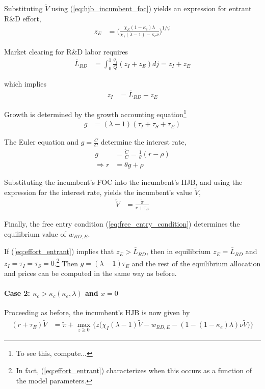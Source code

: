 \documentclass[11pt,english]{article}
\theoremstyle{remark}
\begin{document}
Substituting $\tilde{V}$ using (\ref{eq:hjb_incumbent_foc}) yields an expression for entrant R\&D effort, 
\begin{align}
	z_E &= \Big( \frac{\chi_E (1-\kappa_{e}) \lambda}{\chi_I(\lambda-1) - \kappa_c \nu } \Big)^{1/\psi} \label{eq:effort_entrant}
\end{align}

Market clearing for R\&D labor requires
\begin{align}
	\bar{L}_{RD} &= \int_0^1 \frac{q_j}{Q} (z_{I} + z_{E}) dj = z_I + z_E
\end{align}
 
which implies
\begin{align}
	z_I &= \bar{L}_{RD} - z_E \label{eq:zI_asFuncZe}
\end{align}

Growth is determined by the growth accounting equation\footnote{To see this, compute...}
\begin{align}
g &= (\lambda - 1)(\tau_I + \tau_S + \tau_E) \label{eq:growth_accounting}
\end{align}

The Euler equation and $g = \frac{\dot{C}}{C}$ determine the interest rate, 
\begin{align}
	g &= \frac{\dot{C}}{C} = \frac{1}{\theta} (r - \rho) \label{eq:euler} \\
	\Rightarrow r &= \theta g + \rho \nonumber
\end{align}

Substituting the incumbent's FOC into the incumbent's HJB, and using the expression for the interest rate, yields the incumbent's value $\tilde{V}$,
\begin{align}
	 \tilde{V} &= \frac{\tilde{\pi}}{r + \tau_E}
\end{align}

Finally, the free entry condition (\ref{eq:free_entry_condition}) determines the equilibrium value of $w_{RD,E}$.

If (\ref{eq:effort_entrant}) implies that $z_E > \bar{L}_{RD}$, then in equilibrium $z_E = \bar{L}_{RD}$ and $z_I = \tau_I = \tau_S = 0$.\footnote{In fact, (\ref{eq:effort_entrant}) characterizes when this occurs as a function of the model parameters.} Then $g = (\lambda - 1) \tau_E$ and the rest of the equilibrium allocation and prices can be computed in the same way as before. 

\paragraph{Case 2: $\kappa_c > \bar{\kappa}_c(\kappa_e,\lambda)$ and $x = 0$}
Proceeding as before, the incumbent's HJB is now given by 
\begin{align}
	(r + \tau_E) \tilde{V} &= \tilde{\pi} + \max_{z \ge 0 } \Big\{ z \Big( \chi_I (\lambda - 1) \tilde{V} - w_{RD,E} - (1 - (1-\kappa_e)\lambda) \nu \tilde{V} \Big)  \Big\}\label{eq:hjb_incumbent_noNCA}
\end{align}
\end{document}
